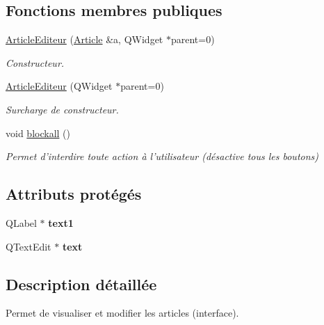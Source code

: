 \subsection*{Fonctions membres publiques}
\begin{DoxyCompactItemize}
\item 
\hyperlink{class_article_editeur_abe5a564e7ba1af7d18a8787cd5936138}{Article\-Editeur} (\hyperlink{class_article}{Article} \&a, Q\-Widget $\ast$parent=0)
\begin{DoxyCompactList}\small\item\em Constructeur. \end{DoxyCompactList}\item 
\hyperlink{class_article_editeur_ae6fa307a670850f56cb20a96999f9a14}{Article\-Editeur} (Q\-Widget $\ast$parent=0)
\begin{DoxyCompactList}\small\item\em Surcharge de constructeur. \end{DoxyCompactList}\item 
\hypertarget{class_article_editeur_ade4f5d8bb85d0f1bfad9535f33174446}{void \hyperlink{class_article_editeur_ade4f5d8bb85d0f1bfad9535f33174446}{blockall} ()}\label{class_article_editeur_ade4f5d8bb85d0f1bfad9535f33174446}

\begin{DoxyCompactList}\small\item\em Permet d'interdire toute action à l'utilisateur (désactive tous les boutons) \end{DoxyCompactList}\end{DoxyCompactItemize}
\subsection*{Attributs protégés}
\begin{DoxyCompactItemize}
\item 
\hypertarget{class_article_editeur_a035b1dc25ffe1ac4bea73834d50f81b8}{Q\-Label $\ast$ {\bfseries text1}}\label{class_article_editeur_a035b1dc25ffe1ac4bea73834d50f81b8}

\item 
\hypertarget{class_article_editeur_a3af526051de08d1540ca694e672a5979}{Q\-Text\-Edit $\ast$ {\bfseries text}}\label{class_article_editeur_a3af526051de08d1540ca694e672a5979}

\end{DoxyCompactItemize}


\subsection{Description détaillée}
Permet de visualiser et modifier les articles (interface). 

